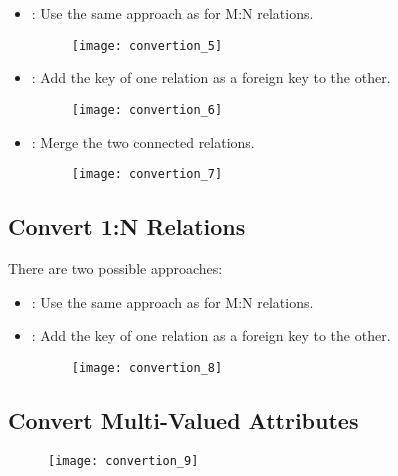 \begin{itemize}
    \item[]  : Use the same approach as for M:N relations.
        \begin{figure}[H]
            \centering
            \texttt{[image: convertion\_5]}
        \end{figure}
    \item[]  : Add the key of one relation as a foreign key to the other.
        \begin{figure}[H]
            \centering
            \texttt{[image: convertion\_6]}
        \end{figure}
    \item[]  : Merge the two connected relations.
        \begin{figure}[H]
            \centering
            \texttt{[image: convertion\_7]}
        \end{figure}
\end{itemize}

\subsection{Convert 1:N Relations}

There are two possible approaches: 

\begin{itemize}
    \item[]  : Use the same approach as for M:N relations.
    \item[]  : Add the key of one relation as a foreign key to the other.
        \begin{figure}[H]
            \centering
            \texttt{[image: convertion\_8]}
        \end{figure}
\end{itemize}

\subsection{Convert Multi-Valued Attributes}


\begin{figure}[H]
    \centering
    \texttt{[image: convertion\_9]}
\end{figure}

